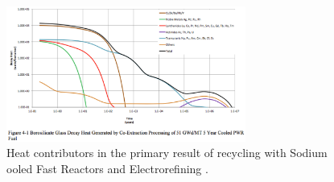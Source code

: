 \begin{figure}[htbp!]
  \begin{center}
    \includegraphics[width=0.7\textwidth]{carter_coex_heat.eps}
  \end{center}
  \caption{Heat contributors in the primary result of recycling with Sodium 
    ooled Fast Reactors and Electrorefining \cite{carter_us_2011}.}
  \label{fig:carter_coex_heat}
\end{figure}
